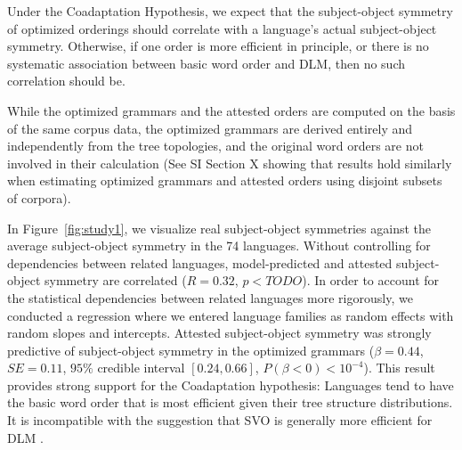 \documentclass[11pt,a4paper]{article}
\newcommand\comment[1]{{\color{red}#1}}
\begin{document}

Under the Coadaptation Hypothesis, we expect that the subject-object symmetry of optimized orderings should correlate with a language's actual subject-object symmetry.
Otherwise, if one order is more efficient in principle, or there is no systematic association between basic word order and DLM, then no such correlation should be.


While the optimized grammars and the attested orders are computed on the basis of the same corpus data, the optimized grammars are derived entirely and independently from the tree topologies, and the original word orders are not involved in their calculation (See SI Section X showing that results hold similarly when estimating optimized grammars and attested orders using disjoint subsets of corpora).



In Figure~\ref{fig:study1}, we visualize real subject-object symmetries against the average subject-object symmetry in the 74 languages.
Without controlling for dependencies between related languages, model-predicted and attested subject-object symmetry are correlated ($R=0.32$, $p<TODO$).
In order to account for the statistical dependencies between related languages more rigorously, we conducted a regression where we entered language families as random effects with random slopes and intercepts.
Attested subject-object symmetry was strongly predictive of subject-object symmetry in the optimized grammars ($\beta = 0.44$, $SE=0.11$, $95\%$ credible interval $[0.24, 0.66]$, $P(\beta<0) < 10^{-4}$).
This result provides strong support for the Coadaptation hypothesis: Languages tend to have the basic word order that is most efficient given their tree structure distributions.
It is incompatible with the suggestion that SVO is generally more efficient for DLM \citep{ferrer-i-cancho-placement-2017}.


\end{document}
